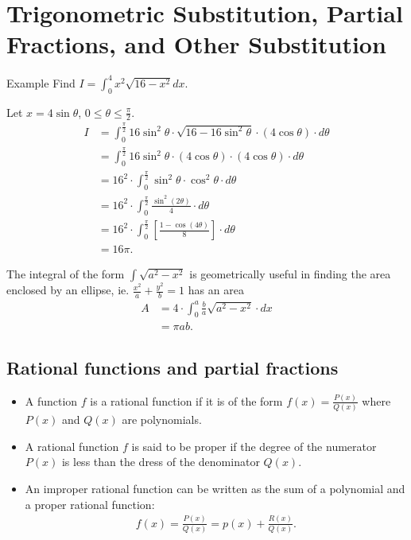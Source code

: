 \documentclass{report}
\begin{document}
\chapter{Trigonometric Substitution, Partial Fractions, and Other Substitution}

	\begin{question}{Example}
		Find $I = \int_0^4 x^2 \sqrt{16 - x^2} dx$.

		Let $x = 4 \sin \theta$, $0 \leq \theta \leq \frac{\pi}{2}$.
		\begin{align*}
			I &= \int_0^{\frac{\pi}{2}} 16 \sin^2\theta \cdot \sqrt{16 - 16\sin^2\theta} \cdot (4\cos\theta) \cdot d\theta	\\
			  &= \int_0^{\frac{\pi}{2}} 16\sin^2\theta \cdot (4\cos\theta) \cdot (4\cos\theta) \cdot d\theta	\\
			  &= 16^2 \cdot \int_0^{\frac{\pi}{2}} \sin^2\theta \cdot \cos^2\theta \cdot d\theta	\\
			  &= 16^2 \cdot \int_0^{\frac{\pi}{2}} \frac{\sin^2(2\theta)}{4} \cdot d\theta	\\
			  &= 16^2 \cdot \int_0^{\frac{\pi}{2}} \left[\frac{1 - \cos(4\theta)}{8}\right] \cdot d\theta	\\
			  &= 16 \pi.
		\end{align*}
	\end{question}

	The integral of the form $\int \sqrt{a^2 - x^2}$ is geometrically useful in finding the area enclosed by an ellipse, ie. $\frac{x^2}{a} + \frac{y^2}{b} = 1$ has an area
	\begin{align*}
		A &= 4 \cdot \int_0^a \frac{b}{a} \sqrt{a^2 - x^2} \cdot dx		\\
		  &= \pi ab.
	\end{align*}

	\section{Rational functions and partial fractions}

		\begin{itemize}
			\item A function $f$ is a rational function if it is of the form $f(x) = \frac{P(x)}{Q(x)}$ where $P(x)$ and $Q(x)$ are polynomials.
			\item A rational function $f$ is said to be proper if the degree of the numerator $P(x)$ is less than the dress of the denominator $Q(x)$.
			\item An improper rational function can be written as the sum of a polynomial and a proper rational function:
				\begin{align*}
					f(x) = \frac{P(x)}{Q(x)} = p(x) + \frac{R(x)}{Q(x)}.
				\end{align*}
		\end{itemize}
		
\end{document}

